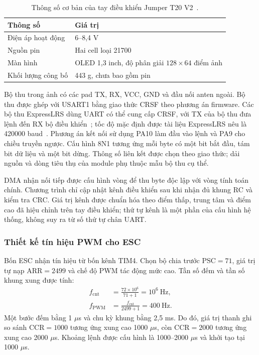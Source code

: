 \begin{table}[htbp]
	\centering
	\caption{Thông số cơ bản của tay điều khiển Jumper T20 V2~\cite{jumperT20V2}.}
	\label{tab:design-transmitter-specifications}
	\begin{tabularx}{\linewidth}{|C{4.2cm}|Y|}
		\hline
		\textbf{Thông số}  & \textbf{Giá trị}                                   \\
		\hline
		Điện áp hoạt động  & 6--8,4 V                                           \\
		\hline
		Nguồn pin          & Hai cell loại 21700                                \\
		\hline
		Màn hình           & OLED 1,3 inch, độ phân giải $128\times64$ điểm ảnh \\
		\hline
		Khối lượng công bố & 443 g, chưa bao gồm pin                            \\
		\hline
	\end{tabularx}
\end{table}

Bộ thu trong ảnh có các pad TX, RX, VCC, GND và đầu nối anten ngoài. Bộ thu được ghép với USART1 bằng giao thức CRSF theo phương án firmware. Các bộ thu ExpressLRS dùng UART có thể cung cấp CRSF, với TX của bộ thu đưa lệnh đến RX bộ điều khiển~\cite{expresslrsReceiverWiring}; tốc độ mặc định được tài liệu ExpressLRS nêu là 420000 baud~\cite{expresslrsUartConfiguration}. Phương án kết nối sử dụng PA10 làm đầu vào lệnh và PA9 cho chiều truyền ngược. Cấu hình 8N1 tương ứng mỗi byte có một bit bắt đầu, tám bit dữ liệu và một bit dừng. Thông số liên kết được chọn theo giao thức; dải nguồn và dòng tiêu thụ của module phụ thuộc mẫu bộ thu cụ thể.

DMA nhận nối tiếp được cấu hình vòng để thu byte độc lập với vòng tính toán chính. Chương trình chỉ cập nhật kênh điều khiển sau khi nhận đủ khung RC và kiểm tra CRC. Giá trị kênh được chuẩn hóa theo điểm thấp, trung tâm và điểm cao đã hiệu chỉnh trên tay điều khiển; thứ tự kênh là một phần của cấu hình hệ thống, không suy ra từ số thứ tự chân UART.

\subsubsection{Thiết kế tín hiệu PWM cho ESC}

Bốn ESC nhận tín hiệu từ bốn kênh TIM4. Chọn bộ chia trước $\mathrm{PSC}=71$, giá trị tự nạp $\mathrm{ARR}=2499$ và chế độ PWM tác động mức cao. Tần số đếm và tần số khung xung được tính:
\begin{equation}
	\begin{aligned}
		f_{\mathrm{cnt}} & =\frac{72\times10^6}{71+1}
		=10^6\ \mathrm{Hz},                                 \\
		f_{\mathrm{PWM}} & =\frac{f_{\mathrm{cnt}}}{2499+1}
		=400\ \mathrm{Hz}.
	\end{aligned}
	\label{eq:design-pwm-timing}
\end{equation}
Một bước đếm bằng 1 $\mu$s và chu kỳ khung bằng 2,5 ms. Do đó, giá trị thanh ghi so sánh $\mathrm{CCR}=1000$ tương ứng xung cao 1000 $\mu$s, còn $\mathrm{CCR}=2000$ tương ứng xung cao 2000 $\mu$s. Khoảng lệnh được cấu hình là 1000--2000 $\mu$s và khởi tạo tại 1000 $\mu$s.

